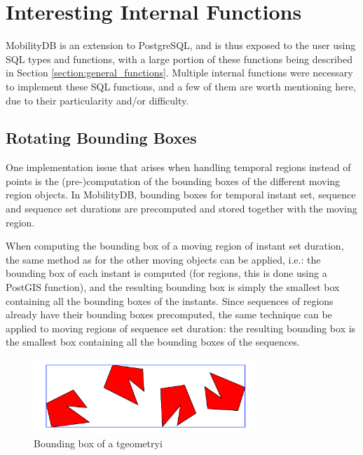 
\clearpage

\section{Interesting Internal Functions}
\label{section:internal_functions}

MobilityDB is an extension to PostgreSQL, and is thus exposed to the user using SQL types and functions, with a large portion of these functions being described in Section \ref{section:general_functions}. Multiple internal functions were necessary to implement these SQL functions, and a few of them are worth mentioning here, due to their particularity and/or difficulty.

\subsection{Rotating Bounding Boxes}
\label{section:bbox}

One implementation issue that arises when handling temporal regions instead of points is the (pre-)computation of the bounding boxes of the different moving region objects. In MobilityDB, bounding boxes for temporal instant set, sequence and sequence set durations are precomputed and stored together with the moving region.
    
When computing the bounding box of a moving region of instant set duration, the same method as for the other moving objects can be applied, i.e.: the bounding box of each instant is computed (for regions, this is done using a PostGIS function), and the resulting bounding box is simply the smallest box containing all the bounding boxes of the instants. Since sequences of regions already have their bounding boxes precomputed, the same technique can be applied to moving regions of sequence set duration: the resulting bounding box is the smallest box containing all the bounding boxes of the sequences.

\begin{figure}[h!]
    \centering
    \includegraphics[width=0.75\textwidth]{images/tgeometryi_bbox.pdf}
    \caption{Bounding box of a tgeometryi}
    \label{fig:tgeometryi_bbox}
\end{figure}


